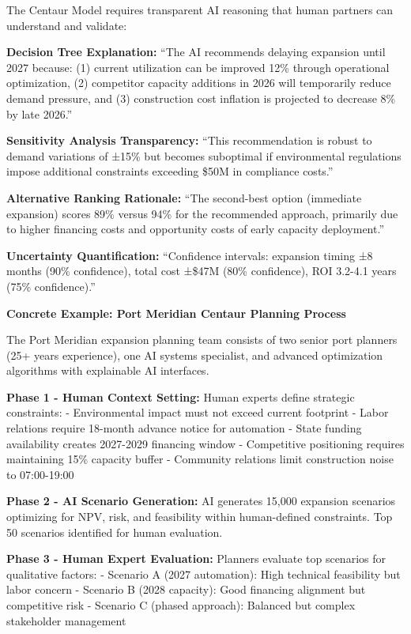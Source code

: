 \documentclass{article}
\begin{document}
The Centaur Model requires transparent AI reasoning that human partners can understand and validate:

\textbf{Decision Tree Explanation:} ``The AI recommends delaying expansion until 2027 because: (1) current utilization can be improved 12\% through operational optimization, (2) competitor capacity additions in 2026 will temporarily reduce demand pressure, and (3) construction cost inflation is projected to decrease 8\% by late 2026.''

\textbf{Sensitivity Analysis Transparency:} ``This recommendation is robust to demand variations of ±15\% but becomes suboptimal if environmental regulations impose additional constraints exceeding \$50M in compliance costs.''

\textbf{Alternative Ranking Rationale:} ``The second-best option (immediate expansion) scores 89\% versus 94\% for the recommended approach, primarily due to higher financing costs and opportunity costs of early capacity deployment.''

\textbf{Uncertainty Quantification:} ``Confidence intervals: expansion timing ±8 months (90\% confidence), total cost ±\$47M (80\% confidence), ROI 3.2-4.1 years (75\% confidence).''

\textbf{Concrete Example: Port Meridian Centaur Planning Process}

The Port Meridian expansion planning team consists of two senior port planners (25+ years experience), one AI systems specialist, and advanced optimization algorithms with explainable AI interfaces.

\textbf{Phase 1 - Human Context Setting:}
Human experts define strategic constraints:
- Environmental impact must not exceed current footprint
- Labor relations require 18-month advance notice for automation
- State funding availability creates 2027-2029 financing window  
- Competitive positioning requires maintaining 15\% capacity buffer
- Community relations limit construction noise to 07:00-19:00

\textbf{Phase 2 - AI Scenario Generation:}
AI generates 15,000 expansion scenarios optimizing for NPV, risk, and feasibility within human-defined constraints. Top 50 scenarios identified for human evaluation.

\textbf{Phase 3 - Human Expert Evaluation:}
Planners evaluate top scenarios for qualitative factors:
- Scenario A (2027 automation): High technical feasibility but labor concern
- Scenario B (2028 capacity): Good financing alignment but competitive risk
- Scenario C (phased approach): Balanced but complex stakeholder management
\end{document}
